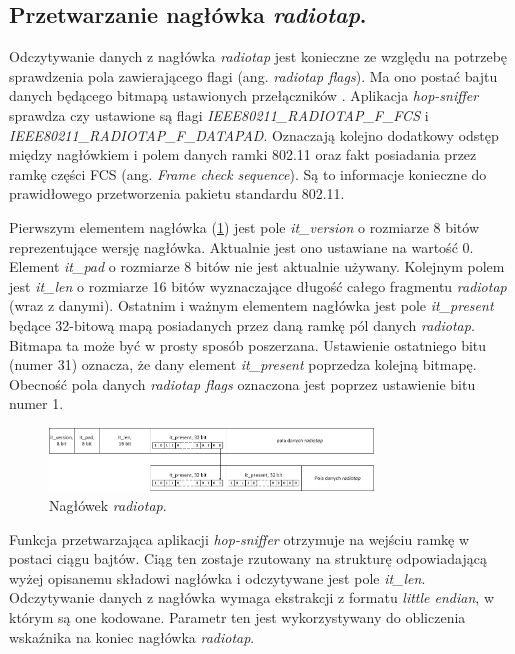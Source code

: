 \subsection{Przetwarzanie nagłówka \emph{radiotap}.}

Odczytywanie danych z nagłówka \emph{radiotap} jest konieczne ze względu na potrzebę sprawdzenia pola zawierającego flagi (ang. \emph{radiotap flags}). Ma ono postać bajtu danych będącego bitmapą ustawionych przełączników . Aplikacja \emph{hop-sniffer} sprawdza czy ustawione są flagi \emph{IEEE80211\_RADIOTAP\_F\_FCS} i \emph{IEEE80211\_RADIOTAP\_F\_DATAPAD}. Oznaczają kolejno dodatkowy odstęp między nagłówkiem i polem danych ramki 802.11 oraz fakt posiadania przez ramkę części FCS (ang. \emph{Frame check sequence}). Są to informacje konieczne do prawidłowego przetworzenia pakietu standardu 802.11.

Pierwszym elementem nagłówka (\ref{RadiotapHeader}) jest pole \emph{it\_version} o rozmiarze 8 bitów reprezentujące wersję nagłówka. Aktualnie jest ono ustawiane na wartość 0. Element \emph{it\_pad} o rozmiarze 8 bitów nie jest aktualnie używany. Kolejnym polem jest \emph{it\_len} o rozmiarze 16 bitów wyznaczające długość całego fragmentu \emph{radiotap} (wraz z danymi). Ostatnim i ważnym elementem nagłówka jest pole \emph{it\_present} będące 32-bitową mapą posiadanych przez daną ramkę pól danych \emph{radiotap}. Bitmapa ta może być w prosty sposób poszerzana. Ustawienie ostatniego bitu (numer 31) oznacza, że dany element \emph{it\_present} poprzedza kolejną bitmapę. Obecność pola danych \emph{radiotap flags} oznaczona jest poprzez ustawienie bitu numer 1. 

\begin{figure}[htb]
\begin{center}
\includegraphics[width=325px]{img/RadiotapHeader}
\caption{Nagłówek \emph{radiotap}.}
\label{RadiotapHeader}
\end{center}
\end{figure}

Funkcja przetwarzająca aplikacji \emph{hop-sniffer} otrzymuje na wejściu ramkę w postaci ciągu bajtów. Ciąg ten zostaje rzutowany na strukturę odpowiadającą wyżej opisanemu składowi nagłówka i odczytywane jest pole \emph{it\_len}. Odczytywanie danych z nagłówka wymaga ekstrakcji z formatu \emph{little endian}, w którym są one kodowane. Parametr ten jest wykorzystywany do obliczenia wskaźnika na koniec nagłówka \emph{radiotap}.

